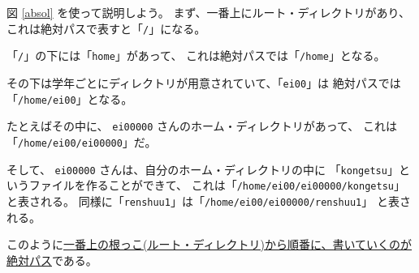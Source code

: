 図 \ref{absol} を使って説明しよう。
まず、一番上にルート・ディレクトリがあり、
これは絶対パスで表すと「\texttt{/}」になる。

「\texttt{/}」の下には「\texttt{home}」があって、
これは絶対パスでは「\texttt{/home}」となる。

その下は学年ごとにディレクトリが用意されていて、「\texttt{ei00}」は
絶対パスでは「\texttt{/home/ei00}」となる。

たとえばその中に、 \texttt{ei00000} さんのホーム・ディレクトリがあって、
これは「\texttt{/home/ei00/ei00000}」だ。

そして、 \texttt{ei00000} さんは、自分のホーム・ディレクトリの中に
「\texttt{kongetsu}」というファイルを作ることができて、
これは「\texttt{/home/ei00/ei00000/kongetsu}」と表される。
同様に「\texttt{renshuu1}」は「\texttt{/home/ei00/ei00000/renshuu1}」
と表される。

このように\underline{一番上の根っこ(ルート・ディレクトリ)から順番に、書いていくのが絶対パス}である。

\bigskip

